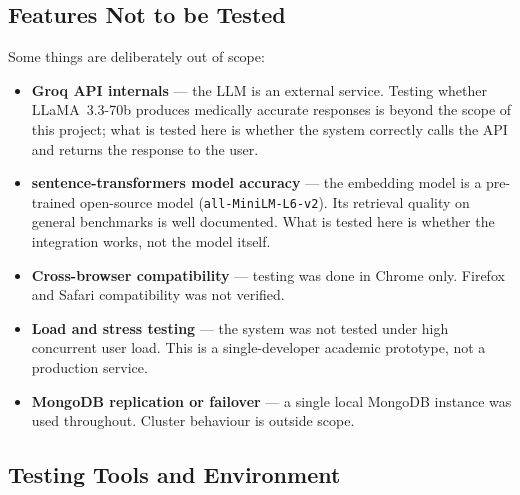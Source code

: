 \subsection{Features Not to be Tested}

Some things are deliberately out of scope:

\begin{itemize}
  \item \textbf{Groq API internals} --- the LLM is an external service. Testing
        whether LLaMA~3.3-70b produces medically accurate responses is beyond the
        scope of this project; what is tested here is whether the system correctly
        calls the API and returns the response to the user.

  \item \textbf{sentence-transformers model accuracy} --- the embedding model is a
        pre-trained open-source model (\texttt{all-MiniLM-L6-v2}). Its retrieval
        quality on general benchmarks is well documented. What is tested here is
        whether the integration works, not the model itself.

  \item \textbf{Cross-browser compatibility} --- testing was done in Chrome only.
        Firefox and Safari compatibility was not verified.

  \item \textbf{Load and stress testing} --- the system was not tested under high
        concurrent user load. This is a single-developer academic prototype, not a
        production service.

  \item \textbf{MongoDB replication or failover} --- a single local MongoDB instance
        was used throughout. Cluster behaviour is outside scope.
\end{itemize}

\subsection{Testing Tools and Environment}

